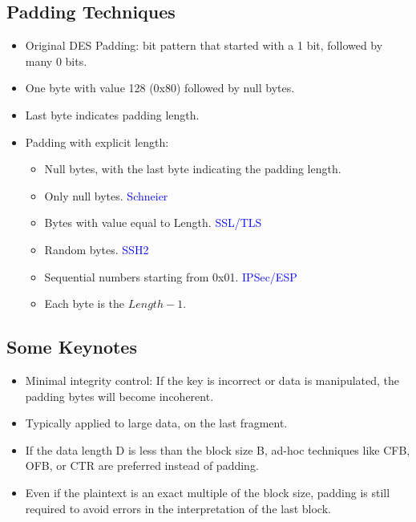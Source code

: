 \subsection*{Padding Techniques}
\begin{itemize}
    \item Original DES Padding: bit pattern that started with a 1 bit, followed by many 0 bits.
    \item One byte with value 128 (0x80) followed by null bytes.
    \item Last byte indicates padding length.
    \item Padding with explicit length:
    \begin{itemize}
        \item Null bytes, with the last byte indicating the padding length.
        \item Only null bytes. \textcolor{Blue}{Schneier}
        \item Bytes with value equal to Length. \textcolor{Blue}{SSL/TLS}
        \item Random bytes. \textcolor{Blue}{SSH2}
        \item Sequential numbers starting from 0x01. \textcolor{Blue}{IPSec/ESP}
        \item Each byte is the $Length-1$.
    \end{itemize}
\end{itemize}

\subsection*{Some Keynotes}
\begin{itemize}
    \item Minimal integrity control: If the key is incorrect or data is manipulated, the padding bytes will become incoherent.
    \item Typically applied to large data, on the last fragment.
    \item If the data length D is less than the block size B, ad-hoc techniques like CFB, OFB, or CTR are preferred instead of padding.
    \item Even if the plaintext is an exact multiple of the block size, padding is still required to avoid errors in the interpretation of the last block.
\end{itemize}

